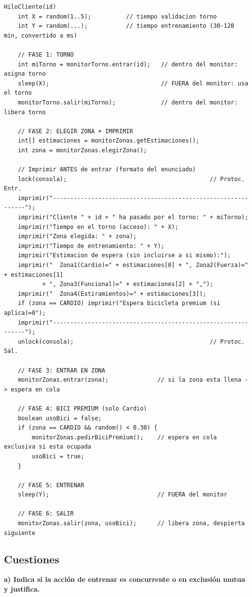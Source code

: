 \documentclass[12pt,a4paper]{article}
\begin{document}
\begin{lstlisting}[language={}, caption={Pseudocódigo HiloCliente}]
HiloCliente(id)
    int X = random(1..5);          // tiempo validacion torno
    int Y = random(...);           // tiempo entrenamiento (30-120 min, convertido a ms)

    // FASE 1: TORNO
    int miTorno = monitorTorno.entrar(id);   // dentro del monitor: asigna torno
    sleep(X);                                // FUERA del monitor: usa el torno
    monitorTorno.salir(miTorno);             // dentro del monitor: libera torno

    // FASE 2: ELEGIR ZONA + IMPRIMIR
    int[] estimaciones = monitorZonas.getEstimaciones();
    int zona = monitorZonas.elegirZona();

    // Imprimir ANTES de entrar (formato del enunciado)
    lock(consola);                                         // Protoc. Entr.
    imprimir("--------------------------------------------------------------");
    imprimir("Cliente " + id + " ha pasado por el torno: " + miTorno);
    imprimir("Tiempo en el torno (acceso): " + X);
    imprimir("Zona elegida: " + zona);
    imprimir("Tiempo de entrenamiento: " + Y);
    imprimir("Estimacion de espera (sin incluirse a si mismo):");
    imprimir("  Zona1(Cardio)=" + estimaciones[0] + ", Zona2(Fuerza)=" + estimaciones[1]
           + ", Zona3(Funcional)=" + estimaciones[2] + ",");
    imprimir("  Zona4(Estiramientos)=" + estimaciones[3]);
    if (zona == CARDIO) imprimir("Espera bicicleta premium (si aplica)=0");
    imprimir("--------------------------------------------------------------");
    unlock(consola);                                       // Protoc. Sal.

    // FASE 3: ENTRAR EN ZONA
    monitorZonas.entrar(zona);              // si la zona esta llena -> espera en cola

    // FASE 4: BICI PREMIUM (solo Cardio)
    boolean usoBici = false;
    if (zona == CARDIO && random() < 0.30) {
        monitorZonas.pedirBiciPremium();    // espera en cola exclusiva si esta ocupada
        usoBici = true;
    }

    // FASE 5: ENTRENAR
    sleep(Y);                               // FUERA del monitor

    // FASE 6: SALIR
    monitorZonas.salir(zona, usoBici);      // libera zona, despierta siguiente
\end{lstlisting}



\subsection{Cuestiones}
\textbf{a) Indica si la acción de entrenar es concurrente o en exclusión mutua y justifica.}
\end{document}
